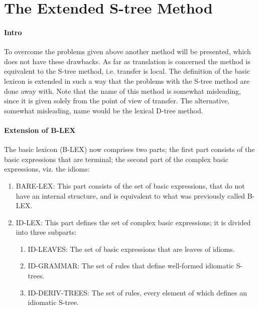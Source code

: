 \section{The Extended S-tree Method}
\label{EST}

\paragraph{Intro}
To overcome the problems given above another method will be presented, which
does not have these drawbacks. As far as translation is concerned the method is
equivalent to the S-tree method, i.e. transfer is local. The definition of the
basic lexicon is extended in such a way that the problems with the S-tree
method are done away with. Note that the name of this method is somewhat 
misleading, since it is given solely from the point of view of transfer. The 
alternative, somewhat misleading, name would be the lexical D-tree method.

\paragraph{Extension of B-LEX}
The basic lexicon (B-LEX) now comprises two parts; the first part consists of 
the basic expressions that are terminal; the second part of the complex basic 
expressions, viz. the idioms:
\begin{enumerate}
  \item BARE-LEX: This part consists of the set of basic expressions, that do
not have an internal structure, and is equivalent to what was previously called
B-LEX. 
  \item ID-LEX: This part defines the set of complex basic expressions; it is
divided into three subparts:
\begin{enumerate}
  \item ID-LEAVES: The set of basic expressions that are leaves of idioms.
  \item ID-GRAMMAR: The set of rules that define well-formed idiomatic S-trees.
  \item ID-DERIV-TREES: The set of rules, every element of which defines an 
idiomatic S-tree.
\end{enumerate}
\end{enumerate}

